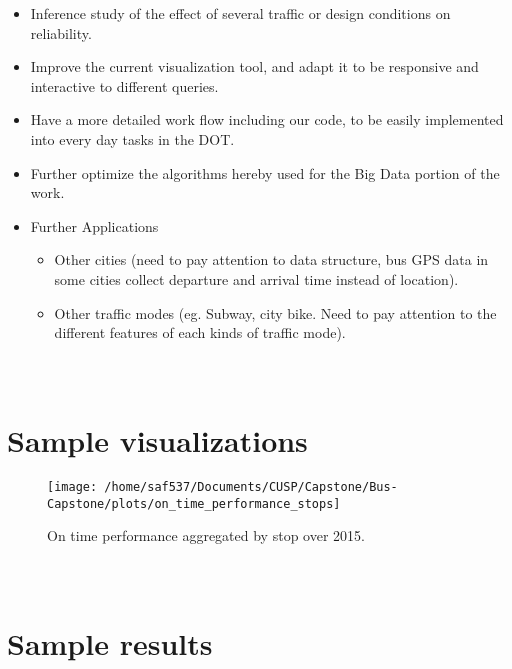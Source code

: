 \documentclass[12pt]{report}
\begin{document}
\begin{itemize}
\item Inference study of the effect of several traffic or design conditions on reliability.
\item Improve the current visualization tool, and adapt it to be responsive and interactive to different queries.
\item Have a more detailed work flow including our code, to be easily implemented into every day tasks in the DOT.
\item Further optimize the algorithms hereby used for the Big Data portion of the work.
\item Further Applications
\begin{itemize}
\item Other cities (need to pay attention to data structure, bus GPS data in some cities collect departure and arrival time instead of location).
\item Other traffic modes (eg. Subway, city bike. Need to pay attention to the different features of each kinds of traffic mode).
\end{itemize}
\end{itemize}



\newpage
\appendix
\section*{\\Sample visualizations} \label{App:AppendixA}


\begin{figure}[!ht]
  \caption{On time performance aggregated by stop over 2015.}
  \centering
    \texttt{[image: /home/saf537/Documents/CUSP/Capstone/Bus-Capstone/plots/on\_time\_performance\_stops]}
\end{figure}

\newpage
\section*{\\Sample results} \label{App:AppendixB}

\end{document}
